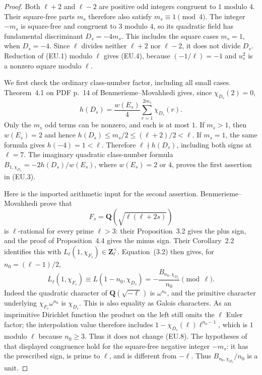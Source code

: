 \documentclass[11pt,a4paper]{article}
\theoremstyle{definition}
\begin{document}
\begin{proof}
Both $\ell+2$ and $\ell-2$ are positive odd integers congruent to $1$
modulo $4$.  Their square-free parts $m_s$ therefore also satisfy
$m_s\equiv1\pmod4$.  The integer $-m_s$ is square-free and congruent
to $3$ modulo $4$, so its quadratic field has fundamental discriminant
$D_s=-4m_s$.  This includes the square cases $m_s=1$, when $D_s=-4$.
Since $\ell$ divides neither $\ell+2$ nor $\ell-2$, it does not divide
$D_s$.  Reduction of (EU.1) modulo $\ell$ gives (EU.4), because
$(-1/\ell)=-1$ and $u_s^2$ is a nonzero square modulo $\ell$.

We first check the ordinary class-number factor, including all small
cases.  Theorem~4.1 on PDF p.~14 of Benmerieme--Movahhedi gives,
since $\chi_{D_s}(2)=0$,
\[
 h(D_s)=\frac{w(E_s)}4\sum_{r=1}^{2m_s}\chi_{D_s}(r).
                                                               \tag{EU.6}
\]
Only the $m_s$ odd terms can be nonzero, and each is at most $1$.
If $m_s>1$, then $w(E_s)=2$ and hence
$h(D_s)\leq m_s/2\leq(\ell+2)/2<\ell$.
If $m_s=1$, the same formula gives $h(-4)=1<\ell$.
Therefore $\ell\nmid h(D_s)$, including both signs at $\ell=7$.
The imaginary quadratic class-number formula
$B_{1,\chi_{D_s}}=-2h(D_s)/w(E_s)$, where $w(E_s)=2$ or $4$,
proves the first assertion in (EU.3).

Here is the imported arithmetic input for the second assertion.
Benmerieme--Movahhedi prove that
\[
             F_s=\mathbf Q(\sqrt{\ell(\ell+2s)})
                                                               \tag{EU.7}
\]
is $\ell$-rational for every prime $\ell>3$: their Proposition~3.2
gives the plus sign, and the proof of Proposition~4.4 gives the minus
sign.  Their Corollary~2.2 identifies this with
$L_\ell(1,\chi_{F_s})\in\mathbf Z_\ell^\times$.
Equation~(3.2) then gives, for $n_0=(\ell-1)/2$,
\[
 L_\ell(1,\chi_{F_s})
       \equiv L(1-n_0,\chi_{D_s})
       =-\frac{B_{n_0,\chi_{D_s}}}{n_0}\pmod\ell.          \tag{EU.8}
\]
Indeed the quadratic character of $\mathbf Q(\sqrt{-\ell})$
is $\omega^{n_0}$, and the primitive character underlying
$\chi_{F_s}\omega^{n_0}$ is $\chi_{D_s}$.  This is also equality
as Galois characters.  As an imprimitive Dirichlet function the
product on the left still omits the $\ell$ Euler factor; the
interpolation value therefore includes
$1-\chi_{D_s}(\ell)\ell^{n_0-1}$, which is $1$ modulo $\ell$
because $n_0\geq3$.  Thus it does not change (EU.8).
The hypotheses of that
displayed congruence hold for the square-free negative integer $-m_s$:
it has the prescribed sign, is prime to $\ell$, and is different from
$-\ell$.  Thus $B_{n_0,\chi_{D_s}}/n_0$ is a unit.


\end{proof}
\end{document}
